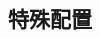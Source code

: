 \documentclass[class=book, crop=false]{standalone}
\begin{document}
\begin{CJK}{UTF8}{gbsn}

\chapter{特殊配置}











\cleardoublepage

\end{CJK}
\end{document}
